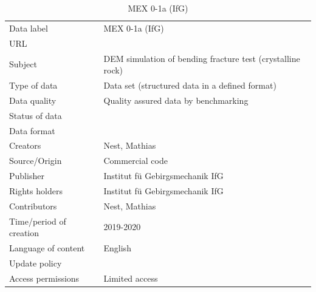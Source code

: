 \begin{table}[!ht]
\caption{MEX 0-1a (IfG)}
\label{tab:dms-mex0-1a-ifg}
\small
\begin{tabular}{R{3.5cm}|L{7.5cm}}
\hline
%
Data label & MEX 0-1a (IfG) \\
URL &  \\ 
Subject  & DEM simulation of bending fracture test (crystalline rock) \\
Type of data  & Data set (structured data in a defined format) \\
Data quality  & Quality assured data by benchmarking \\
Status of data  &  \\
Data format  &  \\
Creators  & Nest, Mathias  \\
Source/Origin & Commercial code \\
Publisher  & Institut f\"u Gebirgsmechanik IfG \\
Rights holders & Institut f\"u Gebirgsmechanik IfG \\
Contributors & Nest, Mathias \\
Time/period of creation & 2019-2020 \\
Language of content & English \\
Update policy &  \\
Access permissions & Limited access \\
%
\hline
\end{tabular}
\end{table}

